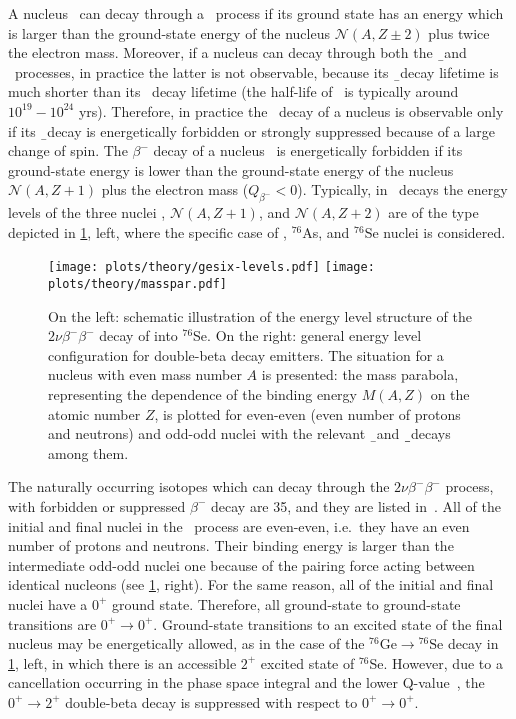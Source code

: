 A nucleus \NAZ\ can decay through a \nnbb\ process if its ground state has an
energy which is larger than the ground-state energy of the nucleus
$\mathcal{N}(A,Z\pm2)$ plus twice the electron mass. Moreover, if a nucleus can
decay through both the \b\ and \nnbb\ processes, in practice the latter is not
observable, because its \b\ decay lifetime is much shorter than its \nnbb\
decay lifetime (the half-life of \nnbb\ is typically around $10^{19}-10^{24}$
yrs). Therefore, in practice the \nnbb\ decay of a nucleus is observable only
if its \b\ decay is energetically forbidden or strongly suppressed because of a
large change of spin. The $\beta^-$ decay of a nucleus \NAZ\ is energetically
forbidden if its ground-state energy is lower than the ground-state energy of
the nucleus $\mathcal{N}(A,Z+1)$ plus the electron mass ($Q_{\beta^{-}} < 0$).
Typically, in \nnbbm\ decays the energy levels of the three nuclei \NAZ,
$\mathcal{N}(A,Z+1)$, and $\mathcal{N}(A,Z+2)$ are of the type depicted in
\cref{fig:nbb:gesixlevels}, left, where the specific case of \gesix,
$^{76}$As, and $^{76}$Se nuclei is considered.

\begin{figure}
  \centering
  \texttt{[image: plots/theory/gesix-levels.pdf]}%
  \texttt{[image: plots/theory/masspar.pdf]}%
  \caption{%
    On the left: schematic illustration of the energy level structure of the
    $2\nu\beta^-\beta^-$ decay of \gesix into $^{76}$Se. On the right: general
    energy level configuration for double-beta decay emitters.  The situation
    for a nucleus with even mass number $A$ is presented: the mass parabola,
    representing the dependence of the binding energy $M(A,Z)$ on the atomic
    number $Z$, is plotted for even-even (even number of protons and neutrons)
    and odd-odd nuclei with the relevant \b\ and \b\b\ decays among them.
  }\label{fig:nbb:gesixlevels}
\end{figure}

\marginnote{$2\nu\beta^-\beta^-$}
The naturally occurring isotopes which can decay through the
$2\nu\beta^-\beta^-$ process, with forbidden or suppressed $\beta^-$ decay are
35, and they are listed in~\cite{Giunti2007}. All of the initial and final
nuclei in the \nnbbm\ process are even-even, i.e.~they have an
even number of protons and neutrons. Their binding energy is larger than the
intermediate odd-odd nuclei one because of the pairing force acting between
identical nucleons (see \cref{fig:nbb:gesixlevels}, right). For the same reason,
all of the initial and final nuclei have a $0^+$ ground state.  Therefore, all
ground-state to ground-state transitions are $0^+\rightarrow0^+$. Ground-state
transitions to an excited state of the final nucleus may be energetically
allowed, as in the case of the $^{76}\text{Ge} \rightarrow {^{76}\text{Se}}$ decay in
\cref{fig:nbb:gesixlevels}, left, in which there is an accessible $2^+$ excited
state of $^{76}$Se. However, due to a cancellation occurring in the phase
space integral and the lower Q-value~\cite{Tomoda1991}, the
$0^+\rightarrow2^+$ double-beta decay is suppressed with respect to
$0^+\rightarrow0^+$.

